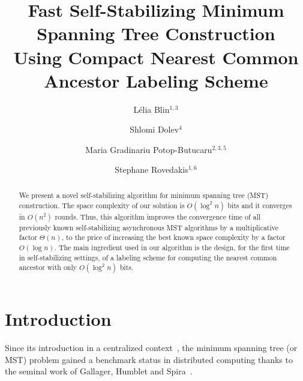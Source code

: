 \documentclass[11pt,a4paper]{article}
\begin{document}
\title{Fast Self-Stabilizing Minimum Spanning Tree Construction\\
 \small{Using Compact Nearest Common Ancestor Labeling Scheme}}



\author{
L{\'e}lia Blin$^{1,3}$
\and
Shlomi Dolev$^4$
\and
Maria Gradinariu Potop-Butucaru$^{2,3,5}$
\and
Stephane Rovedakis$^{1,6}$
}





\maketitle


\begin{abstract}
We present a novel self-stabilizing algorithm for minimum spanning tree (MST) construction. 
The space complexity of our solution is $O(\log^2n)$ bits and it converges in $O(n^2)$ rounds. 
Thus, this algorithm improves the convergence time of all previously known self-stabilizing asynchronous MST algorithms by 
a multiplicative factor $\Theta(n)$, to the price of increasing the best known space complexity by a factor $O(\log n)$. 
The main ingredient used in our algorithm is the design, for the first time in self-stabilizing settings, of a labeling scheme  
for computing the nearest common ancestor with only $O(\log^2n)$ bits. 
\end{abstract}



\section{Introduction}
\label{sec:intro}
Since its introduction in a centralized context~\cite{Prim57,Kruskal56}, the minimum spanning tree (or MST) problem gained a 
benchmark status in distributed computing thanks to the seminal work of Gallager, Humblet and Spira~\cite{GallagerHS83}.  
\end{document}
